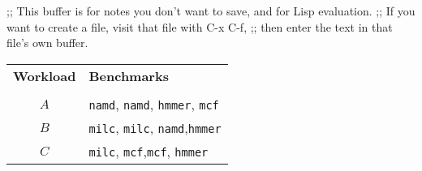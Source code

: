 ;; This buffer is for notes you don't want to save, and for Lisp evaluation.
;; If you want to create a file, visit that file with C-x C-f,
;; then enter the text in that file's own buffer.

\begin{tabular}{c l}
\hline
\textbf{Workload}& \textbf{Benchmarks} \\
\textbf{Mix & \\
\hline
$A$&\texttt{namd}, \texttt{namd}, \texttt{hmmer}, \texttt{mcf}\\
$B$&\texttt{milc}, \texttt{milc}, \texttt{namd},\texttt{hmmer}\\
$C$&\texttt{milc}, \texttt{mcf},\texttt{mcf}, \texttt{hmmer}\\
\hline
\end{tabular}
